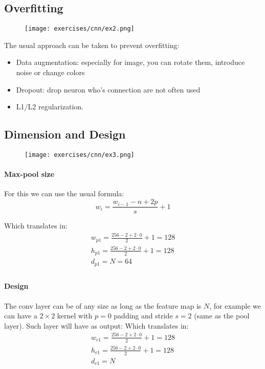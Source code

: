 \subsection{Overfitting}
\begin{figure}[H]
    \centering
    \texttt{[image: exercises/cnn/ex2.png]}
\end{figure}

The usual approach can be taken to prevent overfitting:
\begin{itemize}
\item Data augmentation: especially for image, you can rotate them, introduce noise or change colors
\item Dropout: drop neuron who's connection are not often used
\item L1/L2 regularization.
\end{itemize}


\subsection{Dimension and Design}
\begin{figure}[H]
    \centering
    \texttt{[image: exercises/cnn/ex3.png]}
\end{figure}

\paragraph{Max-pool size}
For this we can use the usual formula:
$$w_i=\frac{w_{i-1}-n+2p}{s}+1$$

Which translates in:
\begin{equation}
\begin{aligned}
w_{p1}=\frac{256 -2+2\cdot 0}{2}+1=128\\
h_{p1}=\frac{256-2 +2\cdot 0}{2}+1=128\\
d_{p1}=N=64\\
\end{aligned}
\end{equation}

\paragraph{Design}
The conv layer can be of any size as long as the feature map is $N$, for example we can have a $2\times 2$ kernel with $p=0$ padding and stride $s=2$ (same as the pool layer). Such layer will have as output:
Which translates in:
\begin{equation}
\begin{aligned}
w_{c1}=\frac{256 -2+2\cdot 0}{2}+1=128\\
h_{c1}=\frac{256-2 +2\cdot 0}{2}+1=128\\
d_{c1}=N\\
\end{aligned}
\end{equation}

